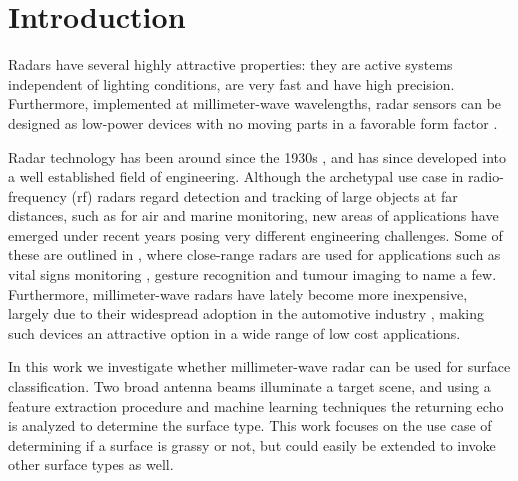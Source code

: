 \chapter{Introduction}

Radars have several highly attractive properties: they are active systems independent of lighting conditions, are very fast and have high precision. Furthermore, implemented at millimeter-wave wavelengths, radar sensors can be designed as low-power devices with no moving parts in a favorable form factor \citep{lien_gillian_karagozler_amihood_schwesig_olson_raja_poupyrev_2016}.

Radar technology has been around since the 1930s \citep{watson-watt_1945}, and has since developed into a well established field of engineering. Although the archetypal use case in radio-frequency (\gls{rf}) radars regard detection and tracking of large objects at far distances, such as for air and marine monitoring, new areas of applications have emerged under recent years posing very different engineering challenges. Some of these are outlined in \citep{amin_2017}, where close-range radars are used for applications such as vital signs monitoring \citep{kuo_lin_yu_lo_lyu_chou_chuang_2016}, gesture recognition \citep{lien_gillian_karagozler_amihood_schwesig_olson_raja_poupyrev_2016} and tumour imaging \citep{klemm_gibbins_leendertz_horseman_preece_benjamin_craddock_2011} to name a few. Furthermore, millimeter-wave radars have lately become more inexpensive, largely due to their widespread adoption in the automotive industry \citep{frenzel_2018}, making such devices an attractive option in a wide range of low cost applications. %

In this work we investigate whether millimeter-wave radar can be used for surface classification. Two broad antenna beams illuminate a target scene, and using a feature extraction procedure and machine learning techniques the returning echo is analyzed to determine the surface type. This work focuses on the use case of determining if a surface is grassy or not, but could easily be extended to invoke other surface types as well.  

